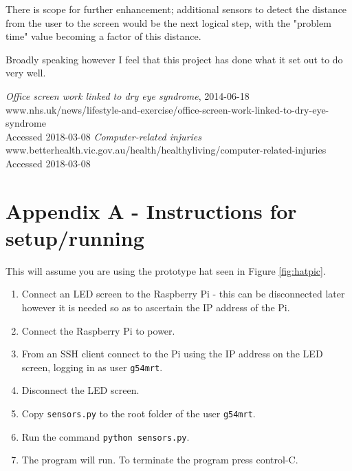 \documentclass[12pt, a4paper]{report}
\begin{document}
\par

There is scope for further enhancement; additional sensors to detect the distance from the user to the screen would be the next logical step, with the "problem time" value becoming a factor of this distance.

\par

Broadly speaking however I feel that this project has done what it set out to do very well.

\begin{thebibliography}{0}
    \textit{Office screen work linked to dry eye syndrome}, 2014-06-18\\
    www.nhs.uk/news/lifestyle-and-exercise/office-screen-work-linked-to-dry-eye-syndrome\\
    Accessed 2018-03-08
    \textit{Computer-related injuries}\\
    www.betterhealth.vic.gov.au/health/healthyliving/computer-related-injuries\\
    Accessed 2018-03-08
\end{thebibliography}

\appendix

\section*{Appendix A - Instructions for setup/running}

This will assume you are using the prototype hat seen in Figure \ref{fig:hatpic}.

\begin{enumerate}
  \item Connect an LED screen to the Raspberry Pi - this can be disconnected later however it is needed so as to ascertain the IP address of the Pi.
  \item Connect the Raspberry Pi to power.
  \item From an SSH client connect to the Pi using the IP address on the LED screen, logging in as user \verb|g54mrt|.
  \item Disconnect the LED screen.
  \item Copy \verb|sensors.py| to the root folder of the user \verb|g54mrt|.
  \item Run the command \verb|python sensors.py|.
  \item The program will run. To terminate the program press control-C.
\end{enumerate}
\end{document}
